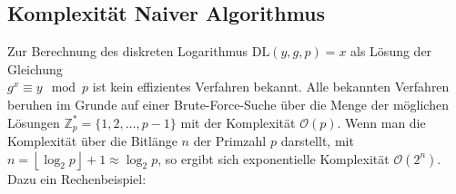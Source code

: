 \documentclass[
  a4paper,
  11pt,
]{scrartcl}
\theoremstyle{plain}
\theoremstyle{definition}
\theoremstyle{remark}
\newcommand{\Z}{\mathbb{Z}}
\begin{document}
\subsection{Komplexität Naiver Algorithmus}
\label{sub:komplexitaet_naiver_algorithmus}

Zur Berechnung des diskreten Logarithmus $\text{DL}(y,g,p) = x$ als Lösung der Gleichung\\
$g^x \equiv y \mod p$ ist kein effizientes Verfahren bekannt. Alle bekannten
Verfahren beruhen im Grunde auf einer Brute-Force-Suche über die Menge der
möglichen Lösungen $\Z_p^* = \{1, 2, \ldots, p-1\}$ mit der Komplexität
$\mathcal{O}(p)$.
Wenn man die Komplexität über die Bitlänge $n$ der Primzahl $p$ darstellt, mit
$n = \left\lfloor \log_2 p \right\rfloor + 1 \approx \log_2 p$, so ergibt sich
exponentielle Komplexität $\mathcal{O}(2^n)$. Dazu ein Rechenbeispiel:
\end{document}
